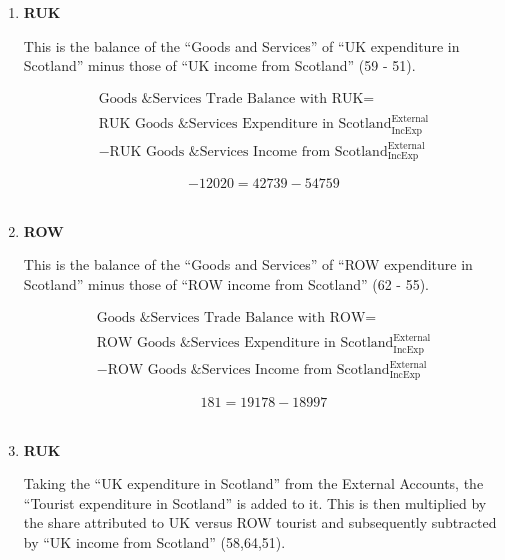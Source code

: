 \begin{enumerate}
\item \textbf {RUK}

This is the balance of the “Goods and Services” of “UK expenditure in Scotland” minus those of “UK income from Scotland” (59 - 51).

\begin{equation}
\begin{split}
\text{Goods \& Services Trade Balance with RUK} =  \\ \\ 
\text{RUK Goods \& Services Expenditure in Scotland}^\text{External}_\text{IncExp}\\
-\text{RUK Goods \& Services Income from Scotland}^\text{External}_\text{IncExp}
\end{split} \label{eq:2.5.71}
\end{equation}

\begin{equation} \nonumber
-12020 = 42739-54759
\end{equation}\\


\item \textbf {ROW}

This is the balance of the “Goods and Services” of “ROW expenditure in Scotland” minus those of “ROW income from Scotland” (62 - 55).

\begin{equation}
\begin{split}
\text{Goods \& Services Trade Balance with ROW} =  \\ \\ 
\text{ROW Goods \& Services Expenditure in Scotland}^\text{External}_\text{IncExp}\\
-\text{ROW Goods \& Services Income from Scotland}^\text{External}_\text{IncExp}
\end{split} \label{eq:2.5.72}
\end{equation}

\begin{equation} \nonumber
181 = 19178-18997
\end{equation}\\



\pagebreak

\item \textbf {RUK}

Taking the “UK expenditure in Scotland” from the External Accounts, the “Tourist expenditure in Scotland” is added to it. This is then multiplied by the share attributed to UK versus ROW tourist and subsequently subtracted by “UK income from Scotland” (58,64,51).  \cite{ONS2010a}\\


\end{enumerate}
